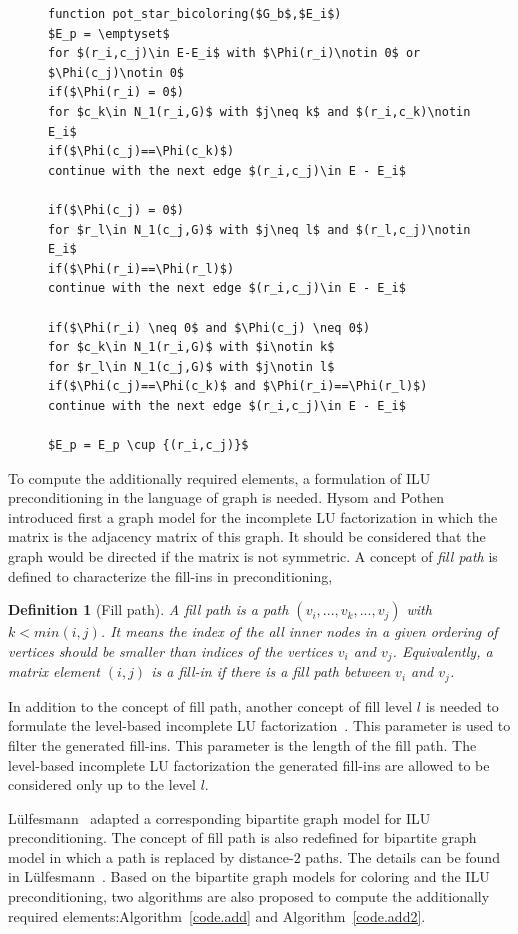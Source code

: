 \documentclass[12pt, twoside,a4paper,toc=bibliography]{scrbook}
\newtheorem{definition}{Definition}
\newcommand{\coderef}[1]{Algorithm~\protect\ref{#1}}
\begin{document}
\begin{figure}
\begin{lstlisting}[caption=Find potentially required elements for star bicoloring,label=code.pot.sb,mathescape]
function pot_star_bicoloring($G_b$,$E_i$)
$E_p = \emptyset$
for $(r_i,c_j)\in E-E_i$ with $\Phi(r_i)\notin 0$ or $\Phi(c_j)\notin 0$
if($\Phi(r_i) = 0$)
for $c_k\in N_1(r_i,G)$ with $j\neq k$ and $(r_i,c_k)\notin E_i$
if($\Phi(c_j)==\Phi(c_k)$)
continue with the next edge $(r_i,c_j)\in E - E_i$

if($\Phi(c_j) = 0$)
for $r_l\in N_1(c_j,G)$ with $j\neq l$ and $(r_l,c_j)\notin E_i$
if($\Phi(r_i)==\Phi(r_l)$)
continue with the next edge $(r_i,c_j)\in E - E_i$

if($\Phi(r_i) \neq 0$ and $\Phi(c_j) \neq 0$)
for $c_k\in N_1(r_i,G)$ with $i\notin k$
for $r_l\in N_1(c_j,G)$ with $j\notin l$
if($\Phi(c_j)==\Phi(c_k)$ and $\Phi(r_i)==\Phi(r_l)$)
continue with the next edge $(r_i,c_j)\in E - E_i$

$E_p = E_p \cup {(r_i,c_j)}$
\end{lstlisting}
\end{figure}

To compute the additionally required elements, a formulation of ILU preconditioning
in the language of graph is needed.
Hysom and Pothen~\cite{precond-pothen} introduced first a graph model for the incomplete
LU factorization in which the matrix is the adjacency matrix of this graph.
It should be considered that the graph would be directed if the matrix is not symmetric.
A concept of \textit{fill path} is defined to characterize the fill-ins in preconditioning,
\begin{definition}[Fill path]\label{d.fill.path}
A fill path is a path $(v_i,...,v_k,...,v_j)$ with
$k<min(i,j)$. It means the index of the all inner nodes in a given ordering of vertices
should be smaller than indices of the vertices $v_i$ and $v_j$.
Equivalently, a matrix element $(i,j)$ is a fill-in if there is a fill path between
$v_i$ and $v_j$.
\end{definition}
In addition to the concept of fill path, another concept of fill level $l$ is needed to
formulate the level-based incomplete LU factorization~\cite{precond-pothen}.
This parameter is used to filter the generated fill-ins.
This parameter is the length of the fill path.
The level-based incomplete LU factorization the generated fill-ins are allowed
to be considered only up to the level $l$.

Lülfesmann~\cite{Lulfesmann2012Fap} adapted a
corresponding bipartite graph model for ILU preconditioning.
The concept of fill path is also redefined for bipartite graph model
in which a path is replaced by distance-$2$ paths.
The details can be found in Lülfesmann~\cite{Lulfesmann2012Fap}.
Based on the bipartite graph models for coloring and the ILU preconditioning,
two algorithms are also proposed to compute the additionally required
elements:\coderef{code.add} and \coderef{code.add2}.
\end{document}

